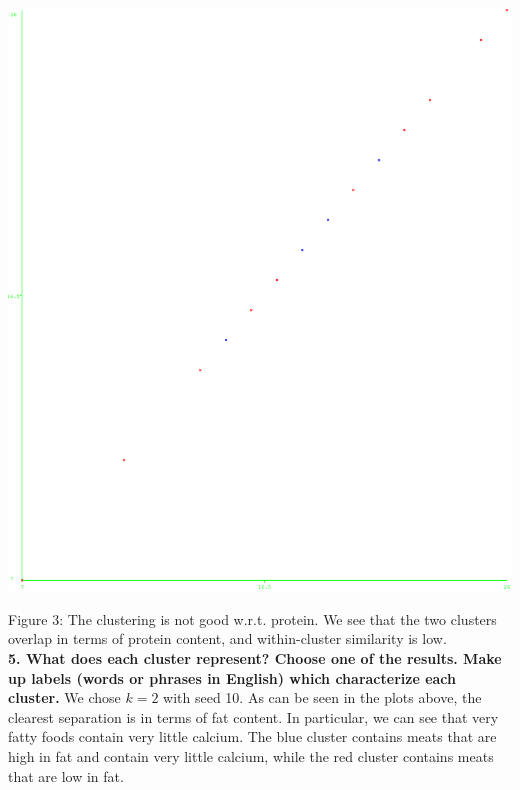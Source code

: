 \documentclass[]{article}
\begin{document}
\includegraphics[scale=0.25]{figures/protein_protein.eps}

\noindent Figure 3: The clustering is not good w.r.t. protein. We see that the two clusters overlap in terms of protein content, and within-cluster similarity is low.\\

\noindent\textbf{5. What does each cluster represent? Choose one of the results. Make up labels (words or phrases in English) which characterize each cluster.}
We chose $k=2$ with seed 10. As can be seen in the plots above, the clearest separation is in terms of fat content. In particular, we can see that very fatty foods contain very little calcium. The blue cluster contains meats that are high in fat and contain very little calcium, while the red cluster contains meats that are low in fat.

\end{document}
